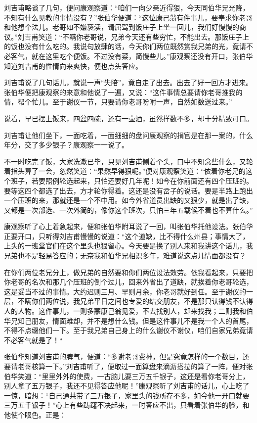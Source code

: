 \documentclass[12pt,UTF8]{ctexbook}
\begin{document}
{{{刘吉甫略谈了几句，便问康观察道：“咱们一向少亲近得狠，今天同伯华兄光降，不知有什么见教的事情没有？”张伯华便道：“这位康己翁有件事儿，要奉求你老哥和他想个法儿。老哥如不嫌亵渎，请屈驾到饭庄子上坐一回儿，我们好慢慢的商议。”刘吉甫笑道：“不瞒你老哥说，兄弟今天还有些穷忙，不能出去。那饭庄子上的饭也没有什么吃的。我说句放肆的话，今天你们两位既然赏我兄弟的光，竟请不必客气，就在这里吃个便饭。不过没有菜，简慢些儿。”康观察还没有开口，张伯华知道刘吉甫的性情向来爽快，便也点头答应。

刘吉甫说了几句话儿，就说一声“失陪”，竟自走了出去。出去了好一回方才进来。张伯华便把康观察的来意和他说了一遍，又说：“这件事情总要请你老哥推我的情，帮个忙儿。至于谢仪一节，只要请你老哥吩咐一声，自然如数送过来。”

说着，早已摆上饭来，四盆四碗，还有一壶酒，虽然样数不多，却十分精致可口。

刘吉甫让他们坐下，一面吃着，一面细细的盘问康观察的捐官是在那一案的，什么年分，交了多少银子？康观察一一说了。

不一时吃完了饭，大家洗漱已毕，只见刘吉甫侧着个头，口中不知念些什么，又轮着指头算了一会，忽然笑道：“果然早得狠呢。”便对康观察笑道：“依着你老兄的这个班子，若要照例轮选起来，只怕还要好几年呢！如今在你前面还有四个压班的。要等这四个都选了出去，方才轮你得着。这还是没有岔子的说话。要是半路上跑出一个压班的来，那就还是一个不中用。如今外省道员出缺的又狠少，就是出了缺，又都是一次部选、一次外简的，像你这个班次，只怕三年五载候不着也不算什么。”

康观察听了心上着急起来，便和张伯华附耳说了一回，叫张伯华托他设法。张伯华正要开口，只听得刘吉甫慢慢的说道：“这个道缺，比不得什么州县；事情大了，上头的一班堂官们在这个里头也狠留心。今天要是换了别人来和我讲这个话儿，我兄弟也不是轻易答应的；无奈我和伯华兄相识多年，难道说这点儿情面都没有？

在你们两位老兄分上，做兄弟的自然要和你们两位设法效劳。依我看起来，只要把你老哥的名次和那几个压班的倒个过儿，回来外省出了道缺，就挨着你老哥轮选，这是妥当不过的事情。大约迟则三月、早则月余，你老哥就好到任。至于谢仪的一层，不瞒你们两位说，我兄弟平日之间也专爱的结交朋友，不是那只认得钱不认得人的人物。这件事儿，一则多蒙康己翁见爱，不去找别人，却来找我；二则我和伯华兄知己朋友，情面难却，并不是想什么钱。但是这件事儿不是我一个人的首尾，不得不点缀他们一下。至于我兄弟自己身上的什么谢仪不谢仪，咱们自家兄弟竟请不必客气就是了！“

张伯华知道刘吉甫的脾气，便道：“多谢老哥费神，但是究竟怎样的一个数目，还要请老哥核算一下。”刘吉甫听了，便取过一面算盘来滴沥搭拉的算了一阵，便对张伯华笑道：“里里外外的使费，一古脑儿要三万五千银子，这还是看你老哥分上，别人拿了五万银子，我还不见得答应他呢！”康观察听了刘吉甫的话儿，心上吃了一惊，暗想：“自己通共带了三万银子，家里头的钱所存不多，如今他一开口就要三万五千银子！”心上有些踌躇不决起来，一时答应不出，只看着张伯华的脸，和他使个眼色。正是：

}}}
\end{document}
